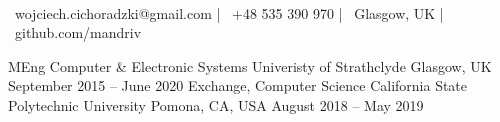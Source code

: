 \documentclass[]{awesome-cv}
\begin{document}
\begin{center}
	  \\
	\vspace{2mm}
	{\faEnvelope\ wojciech.cichoradzki@gmail.com} | {\faMobile\ +48 535 390 970} | {\faMapMarker\ Glasgow, UK} | {\faLink\ github.com/mandriv}
\end{center}
\begin{cventries}
	\cventry
	{MEng Computer \& Electronic Systems}
	{Univeristy of Strathclyde}
	{Glasgow, UK}
	{September 2015 – June 2020}
	{}
	\cventry
	{Exchange, Computer Science}
	{California State Polytechnic University}
	{Pomona, CA, USA}
	{August 2018 – May 2019}
	{}
\end{cventries}
\end{document}
